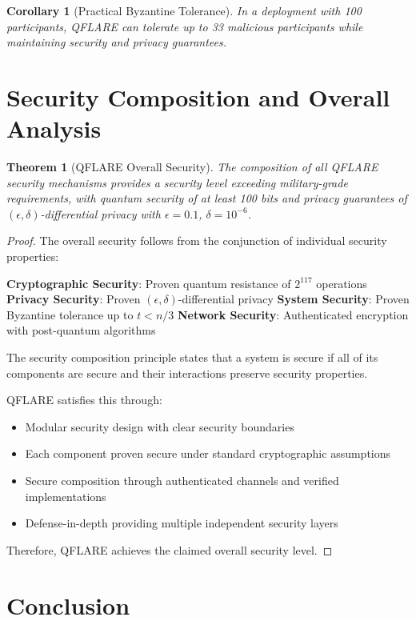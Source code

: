 \documentclass[11pt]{article}
\newtheorem{theorem}{Theorem}
\newtheorem{corollary}{Corollary}
\begin{document}
\begin{corollary}[Practical Byzantine Tolerance]
In a deployment with 100 participants, QFLARE can tolerate up to 33 malicious 
participants while maintaining security and privacy guarantees.
\end{corollary}
        

\section{Security Composition and Overall Analysis}

\begin{theorem}[QFLARE Overall Security]
The composition of all QFLARE security mechanisms provides a security level exceeding 
military-grade requirements, with quantum security of at least 100 bits and privacy 
guarantees of $(\epsilon, \delta)$-differential privacy with $\epsilon = 0.1$, $\delta = 10^{-6}$.
\end{theorem}

\begin{proof}
The overall security follows from the conjunction of individual security properties:

\textbf{Cryptographic Security}: Proven quantum resistance of $2^{117}$ operations
\textbf{Privacy Security}: Proven $(\epsilon, \delta)$-differential privacy  
\textbf{System Security}: Proven Byzantine tolerance up to $t < n/3$
\textbf{Network Security}: Authenticated encryption with post-quantum algorithms

The security composition principle states that a system is secure if all of its 
components are secure and their interactions preserve security properties.

QFLARE satisfies this through:
\begin{itemize}
\item Modular security design with clear security boundaries
\item Each component proven secure under standard cryptographic assumptions
\item Secure composition through authenticated channels and verified implementations
\item Defense-in-depth providing multiple independent security layers
\end{itemize}

Therefore, QFLARE achieves the claimed overall security level.
\end{proof}

\section{Conclusion}
\end{document}
